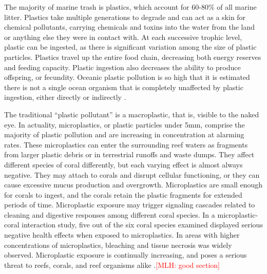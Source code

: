 \documentclass{book}\usepackage{knitr}
\newcommand{\red}[1]{\textcolor{red}{[MLH: #1]}}
\begin{document}
\begin{knitrout}
\begin{kframe}
{The majority of marine trash is plastics, which account for 60-80\% of all marine litter. Plastics take multiple generations to degrade and can act as a skin for chemical pollutants, carrying chemicals and toxins into the water from the land or anything else they were in contact with. At each successive trophic level, plastic can be ingested, as there is significant variation among the size of plastic particles. Plastics travel up the entire food chain, decreasing both energy reserves and feeding capacity. Plastic ingestion also decreases the ability to produce offspring, or fecundity. Oceanic plastic pollution is so high that it is estimated there is not a single ocean organism that is completely unaffected by plastic ingestion, either directly or indirectly \citep{12907334620180601}.

The traditional ``plastic pollutant'' is a macroplastic, that is, visible to the naked eye. In actuality, microplastics, or plastic particles under 5mm, comprise the majority of plastic pollution and are increasing in concentration at alarming rates. These microplastics can enter the surrounding reef waters as fragments from larger plastic debris or in terrestrial runoffs and waste dumps. They affect different species of coral differently, but each varying effect is almost always negative. They may attach to corals and disrupt cellular functioning, or they can cause excessive mucus production and overgrowth. Microplastics are small enough for corals to ingest, and the corals retain the plastic fragments for extended periods of time. Microplastic exposure may trigger signaling cascades related to cleaning and digestive responses among different coral species. In a microplastic-coral interaction study, five out of the six coral species examined displayed serious negative health effects when exposed to microplastics. In areas with higher concentrations of microplastics, bleaching and tissue necrosis was widely observed. Microplastic exposure is continually increasing, and poses a serious threat to reefs, corals, and reef organisms alike \citep{12907334620180601}.\red{good section}

}
\end{kframe}
\end{knitrout}
\end{document}
